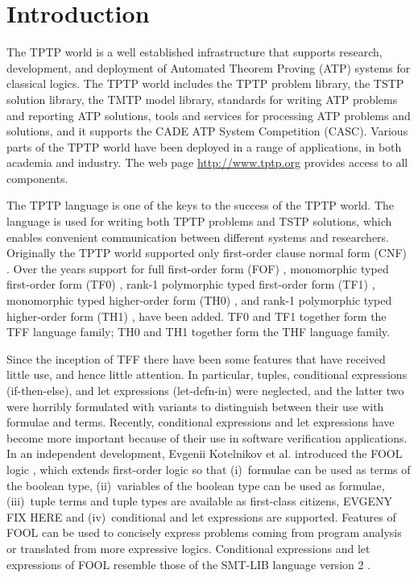 \documentclass{easychair}
\begin{document}
\renewcommand{\implies}{\Rightarrow}
\newcommand{\liff}{\Leftrightarrow}
\newcommand{\lniff}{\not\Leftrightarrow}
\newcommand{\bool}{\mathit{bool}}

\section{Introduction}
\label{Introduction}

The TPTP world \cite{Sut10} is a well established infrastructure that supports
research, development, and deployment of Automated Theorem Proving (ATP)
systems for classical logics.
The TPTP world includes the TPTP problem library,
the TSTP solution library,
the TMTP model library,
standards for writing ATP problems and reporting ATP solutions,
tools and services for processing ATP problems and solutions,
and it supports the CADE ATP System Competition (CASC).
Various parts of the TPTP world have been deployed in a range of applications,
in both academia and industry.
The web page \url{http://www.tptp.org} provides access to all components.

The TPTP language is one of the keys to the success of the TPTP world.
The language is used for writing both TPTP problems and TSTP solutions,
which enables convenient communication between different systems and
researchers.
Originally the TPTP world supported only first-order clause normal form (CNF)
\cite{SS98-JAR}.
Over the years support for full first-order form (FOF) \cite{Sut09},
monomorphic typed first-order form (TF0) \cite{SS+12}, rank-1 polymorphic
typed first-order form (TF1) \cite{BP13-TFF1}, monomorphic typed higher-order 
form (TH0) \cite{SB10}, and rank-1 polymorphic typed higher-order form (TH1) 
\cite{KSR16}, have been added.
TF0 and TF1 together form the TFF language family; TH0 and TH1 together form 
the THF language family.

Since the inception of TFF there have been some features that have 
received little use, and hence little attention. 
In particular, tuples, conditional expressions (if-then-else), and let 
expressions (let-defn-in) were neglected, and the latter two were horribly 
formulated with variants to distinguish between their use with formulae and 
terms. 
Recently, conditional expressions and let expressions have become more 
important because of their use in software verification applications.
In an independent development, Evgenii Kotelnikov et al. introduced the FOOL 
logic \cite{KKV15}, which extends first-order logic so that (i)~formulae can 
be used as terms of the boolean type, (ii)~variables of the boolean type can 
be used as formulae, (iii)~tuple terms and tuple types are available as 
first-class citizens, 
EVGENY FIX HERE
and (iv)~conditional and let expressions are supported. 
Features of FOOL can be used to concisely express problems coming from program
analysis \cite{KKV18} or translated from more expressive logics.
Conditional expressions and let expressions of FOOL resemble those of the 
SMT-LIB language version 2 \cite{BST10}.
\end{document}
